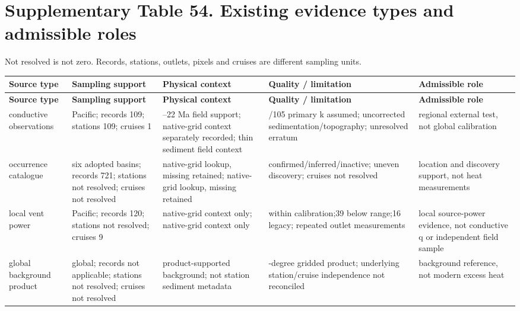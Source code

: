 \section*{Supplementary Table 54. Existing evidence types and admissible roles}
Not resolved is not zero. Records, stations, outlets, pixels and cruises are different sampling units.\par
{\fontsize{8.3}{10.1}\selectfont\begin{longtable}{>{\raggedright\arraybackslash}p{31.883mm}>{\raggedright\arraybackslash}p{31.883mm}>{\raggedright\arraybackslash}p{31.883mm}>{\raggedright\arraybackslash}p{31.883mm}>{\raggedright\arraybackslash}p{31.883mm}}\toprule
\textbf{Source type} & \textbf{Sampling support} & \textbf{Physical context} & \textbf{Quality /\allowbreak{} limitation} & \textbf{Admissible role}\\\midrule\endfirsthead
\textbf{Source type} & \textbf{Sampling support} & \textbf{Physical context} & \textbf{Quality /\allowbreak{} limitation} & \textbf{Admissible role}\\\midrule\endhead
\bottomrule\endfoot
conductive observations & Pacific; records 109; stations 109; cruises 1 & 18--22 Ma field support; native-grid context separately recorded; thin sediment field context & 56/\allowbreak{}105 primary k assumed; uncorrected sedimentation/\allowbreak{}topography; unresolved erratum & regional external test, not global calibration\\
occurrence catalogue & six adopted basins; records 721; stations not resolved; cruises not resolved & native-grid lookup, missing retained; native-grid lookup, missing retained & confirmed/\allowbreak{}inferred/\allowbreak{}inactive; uneven discovery; cruises not resolved & location and discovery support, not heat measurements\\
local vent power & Pacific; records 120; stations not resolved; cruises 9 & native-grid context only; native-grid context only & 65 within calibration;39 below range;16 legacy; repeated outlet measurements & local source-power evidence, not conductive q or independent field sample\\
global background product & global; records not applicable; stations not resolved; cruises not resolved & product-supported background; not station sediment metadata & 2-degree gridded product; underlying station/\allowbreak{}cruise independence not reconciled & background reference, not modern excess heat\\

\end{longtable}}
